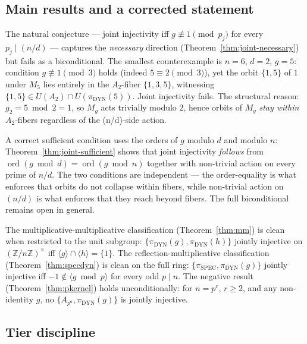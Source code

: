 \documentclass[11pt,reqno]{amsart}
\theoremstyle{plain}
\theoremstyle{definition}
\theoremstyle{remark}
\DeclareMathOperator{\ord}{ord}
\DeclareMathOperator{\spec}{SPEC}
\DeclareMathOperator{\dyn}{DYN}
\newcommand{\Z}{\mathbb{Z}}
\begin{document}
\subsection{Main results and a corrected statement}

The natural conjecture --- joint injectivity iff $g \not\equiv 1
\pmod{p_{j}}$ for every $p_{j} \mid (n/d)$ --- captures the
\emph{necessary} direction (Theorem~\ref{thm:joint-necessary}) but
fails as a biconditional. The smallest counterexample is $n = 6$,
$d = 2$, $g = 5$: condition $g \not\equiv 1 \pmod{3}$ holds (indeed
$5 \equiv 2 \pmod{3}$), yet the orbit $\{1, 5\}$ of $1$ under $M_{5}$
lies entirely in the $A_{2}$-fiber $\{1, 3, 5\}$, witnessing
$\{1, 5\} \in U(A_{2}) \cap U(\pi_{\dyn}(5))$. Joint injectivity
fails. The structural reason: $g_{2} = 5 \bmod 2 = 1$, so $M_{g}$
acts trivially modulo $2$, hence orbits of $M_{g}$ \emph{stay within}
$A_{2}$-fibers regardless of the (n/d)-side action.

A correct sufficient condition uses the orders of $g$ modulo $d$ and
modulo $n$: Theorem~\ref{thm:joint-sufficient} shows that joint
injectivity \emph{follows} from $\ord(g \bmod d) = \ord(g \bmod n)$
together with non-trivial action on every prime of $n/d$. The two
conditions are independent --- the order-equality is what enforces
that orbits do not collapse within fibers, while non-trivial action
on $(n/d)$ is what enforces that they reach beyond fibers. The full
biconditional remains open in general.

The multiplicative-multiplicative classification
(Theorem~\ref{thm:mm}) is clean when restricted to the unit subgroup:
$\{\pi_{\dyn}(g), \pi_{\dyn}(h)\}$ jointly injective on $(\Z/n\Z)^{\times}$
iff $\langle g \rangle \cap \langle h \rangle = \{1\}$. The
reflection-multiplicative classification (Theorem~\ref{thm:specdyn})
is clean on the full ring: $\{\pi_{\spec}, \pi_{\dyn}(g)\}$ jointly
injective iff $-1 \notin \langle g \bmod p \rangle$ for every odd
$p \mid n$. The negative result (Theorem~\ref{thm:pkernel}) holds
unconditionally: for $n = p^{r}$, $r \ge 2$, and any non-identity
$g$, no $\{A_{p^{a}}, \pi_{\dyn}(g)\}$ is jointly injective.

\subsection{Tier discipline}
\end{document}
